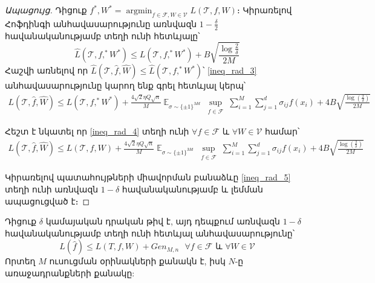 \documentclass[11pt]{article}
\DeclareMathOperator*{\argmin}{argmin}
\DeclareMathOperator*{\E}{\mathbb{E}}
\begin{document}
\begin{proof}[Ապացույց]
Դիցուք $f^*, W^* = \argmin_{f \in \mathcal{F}, W \in \mathcal{V}}L(\mathcal{T}, f, W)$։ Կիրառելով Հոֆդինգի անհավասարությունը առնվազն $1- \frac{\delta}{2}$ հավանականությամբ տեղի ունի հետևյալը՝
$$\hat{L}(\mathcal{T}, f,^* W^*) \leq L(\mathcal{T}, f,^* W^*) + B\sqrt{\frac{\log\frac{2}{\delta}}{2M}}$$
Հաշվի առնելով որ $\hat{L}(\mathcal{T}, \hat{f}, \hat{W})  \leq \hat{L}(\mathcal{T}, f,^* W^*) $՝ \ref{ineq_rad_3} անհավասարությունը կարող ենք գրել հետևյալ կերպ՝
\begin{align}
\label{ineq_rad_4}
L(\mathcal{T}, \hat{f}, \hat{W}) \leq  L(\mathcal{T}, f,^* W^*) + \frac{4\sqrt{2} \eta Q\sqrt{n}}{M} \E_{\sigma \sim \{\pm1\}^{Md}} \sup_{\substack{ f  \in \mathcal{F}  }}\sum_{i=1}^M \sum_{j=1}^d \sigma_{ij}f(x_i)+    4B\sqrt{\frac{\log \left( \frac{2}{\delta} \right)}{2M}}
\end{align}

\noindent Հեշտ է նկատել որ \ref{ineq_rad_4} տեղի ունի  $\forall f \in \mathcal{ F}$ և $\forall W \in \mathcal{V}$ համար՝
\begin{align}
\label{ineq_rad_5}
L(\mathcal{T}, \hat{f}, \hat{W}) \leq  L(\mathcal{T}, f, W) + \frac{4\sqrt{2} \eta Q\sqrt{n}}{M} \E_{\sigma \sim \{\pm1\}^{Md}} \sup_{\substack{ f  \in \mathcal{F}  }}\sum_{i=1}^M \sum_{j=1}^d \sigma_{ij}f(x_i)+    4B\sqrt{\frac{\log \left( \frac{2}{\delta} \right)}{2M}}
\end{align}

Կիրառելով պատահույթների միավորման բանաձևը \ref{ineq_rad_5} տեղի ունի առնվազն $1-\delta$ հավանականությամբ և լեմման ապացուցված է։

\end{proof}

\begin{theorem}
Դիցուք $\delta$ կամայական դրական թիվ է, այդ դեպքում առնվազն $1-\delta$ հավանականությամբ տեղի ունի հետևյալ անհավասարությունը՝ 
$$L(\hat{f}) \leq L(T, f, W) + Gen_{M, n} \text{  } \forall f \in \mathcal{F} \text{ և } \forall{W} \in \mathcal{V}$$
Որտեղ $M$ ուսուցման օրինակների քանակն է, իսկ $N$-ը առաջադրանքների քանակը:
\end{theorem}
\end{document}
